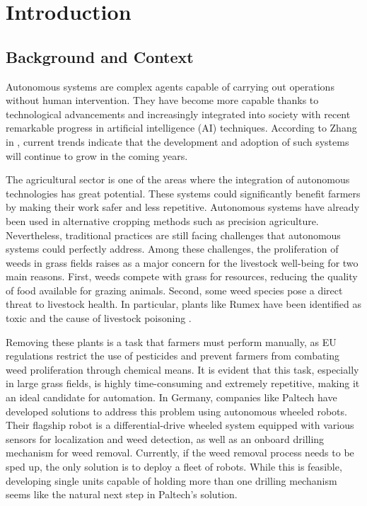 \chapter{Introduction}\label{ch:introduction}
\section{Background and Context}
Autonomous systems are complex agents capable of carrying out operations without human intervention. They have become more capable thanks to technological advancements and increasingly integrated into society with recent remarkable progress in artificial intelligence (AI) techniques. According to Zhang in \cite{Zhang2017}, current trends indicate that the development and adoption of such systems will continue to grow in the coming years.  

The agricultural sector is one of the areas where the integration of autonomous technologies has great potential. These systems could significantly benefit farmers by making their work safer and less repetitive. Autonomous systems have already been used in alternative cropping methods such as precision agriculture. Nevertheless, traditional practices are still facing challenges that autonomous systems could perfectly address. Among these challenges, the proliferation of weeds in grass fields raises as a major concern for the livestock well-being for two main reasons. First, weeds compete with grass for resources, reducing the quality of food available for grazing animals. Second, some weed species pose a direct threat to livestock health. In particular, plants like Rumex have been identified as toxic and the cause of livestock poisoning \cite{Panciera1990}.

Removing these plants is a task that farmers must perform manually, as EU regulations restrict the use of pesticides and prevent farmers from combating weed proliferation through chemical means. It is evident that this task, especially in large grass fields, is highly time-consuming and extremely repetitive, making it an ideal candidate for automation. In Germany, companies like Paltech have developed solutions to address this problem using autonomous wheeled robots. Their flagship robot is a differential-drive wheeled system equipped with various sensors for localization and weed detection, as well as an onboard drilling mechanism for weed removal. Currently, if the weed removal process needs to be sped up, the only solution is to deploy a fleet of robots. While this is feasible, developing single units capable of holding more than one drilling mechanism seems like the natural next step in Paltech's solution.

